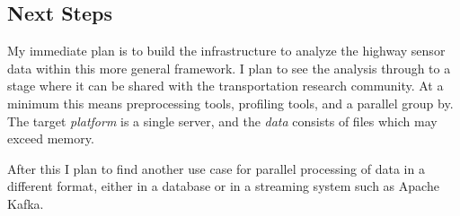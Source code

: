 \documentclass[12pt]{article}
\begin{document}
\subsection{Next Steps}

My immediate plan is to build the infrastructure to analyze the highway
sensor data within this more general framework. I plan to see the analysis
through to a stage where it can be shared with the transportation research
community.  At a minimum this means preprocessing tools, profiling tools,
and a parallel group by. The target \emph{platform} is a single server, and
the \emph{data} consists of files which may exceed memory.

After this I plan to find another use case for parallel processing of data
in a different format, either in a database or in a streaming system such
as Apache Kafka.


 
\end{document}
